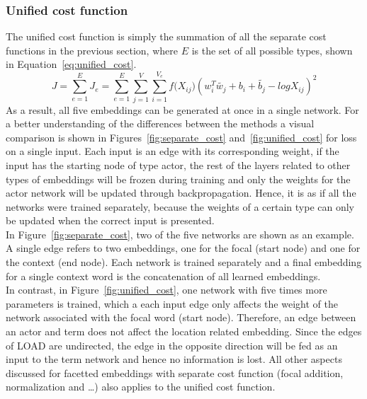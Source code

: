 \subsubsection{Unified cost function  }
\label{sec:unified_cost}
The unified cost function is simply the summation of all the separate cost functions in the previous section, where $E$ is the set of all possible types, shown in Equation~\ref{eq:unified_cost}.
\begin{equation}
J=\sum _{ e=1 }^{ E }{J_e}=\sum _{ e=1 }^{ E }{}\sum _{ j=1 }^{ V }{}\sum _{ i=1 }^{ V_e }{ f({ X }_{ ij } } )(w_{ i }^{ T }\tilde{  w_{ j } } +b_{ i }+\tilde{  b_{ j } } -log{ X }_{ ij })^2
\label{eq:unified_cost}
\end{equation}
As a result, all five embeddings can be generated at once in a single network. For a better understanding of the differences between the methods a visual comparison is shown in Figures~\ref{fig:separate_cost} and~\ref{fig:unified_cost} for loss on a single input. Each input is an edge with its corresponding weight, if the input has the starting node of type actor, the rest of the layers related to other types of embeddings will be frozen during training and only the weights for the actor network will be updated through backpropagation. Hence, it is as if all the networks were trained separately, because the weights of a certain type can only be updated when the correct input is presented.  \\
In Figure~\ref{fig:separate_cost}, two of the five networks are shown as an example. A single edge refers to two embeddings, one for the focal (start node) and one for the context (end node). Each network is trained separately and a final embedding for a single context word is the concatenation of all learned embeddings. \\
In contrast, in Figure~\ref{fig:unified_cost}, one network with five times more parameters is trained, which a each input edge only affects the weight of the network associated with the focal word (start node). Therefore, an edge between an actor and term does not affect the location related embedding. Since the edges of LOAD are undirected, the edge in the opposite direction will be fed as an input to the term network and hence no information is lost. All other aspects discussed for facetted embeddings with separate cost function (focal addition, normalization and \dots) also applies to the unified cost function. 

